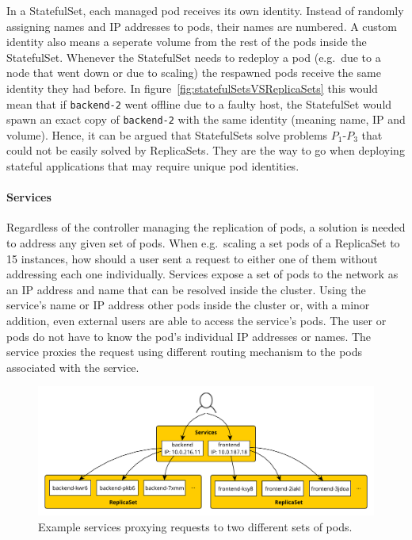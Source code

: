 In a StatefulSet, each managed pod receives its own identity. Instead of
randomly assigning names and \ac{IP} addresses to pods, their names are
numbered. A custom identity also means a seperate volume from the rest of the
pods inside the StatefulSet. Whenever the StatefulSet needs to redeploy a pod
(e.g.\ due to a node that went down or due to scaling) the respawned pods
receive the same identity they had before. In
figure~\ref{fig:statefulSetsVSReplicaSets} this would mean that if
\texttt{backend-2} went offline due to a faulty host, the StatefulSet would
spawn an exact copy of \texttt{backend-2} with the same identity (meaning name,
\ac{IP} and volume). Hence, it can be argued that StatefulSets solve problems
$P_1$-$P_3$ that could not be easily solved by ReplicaSets. They are the way to
go when deploying stateful applications that may require unique pod identities.

\paragraph{Services}%
\label{par:Services}
Regardless of the controller managing the replication of pods, a solution is
needed to address any given set of pods. When e.g.\ scaling a set pods of a
ReplicaSet to 15 instances, how should a user sent a request to either one of
them without addressing each one individually. Services expose a set of pods to
the network as an \ac{IP} address and name that can be resolved inside the
cluster. Using the service's name or \ac{IP} address other pods inside the
cluster or, with a minor addition, even external users are able to access the
service's pods. The user or pods do not have to know the pod's individual
\ac{IP} addresses or names. The service proxies the request using different
routing mechanism \autocite{AuthorsService2019} to the pods associated with the
service.

\begin{figure}[H]
\begin{center}
  \includegraphics[scale=0.7]{images/figures/service_example.pdf}
\end{center}
\caption{Example services proxying requests to two different sets of pods.}%
\label{fig:services_example}
\end{figure}

